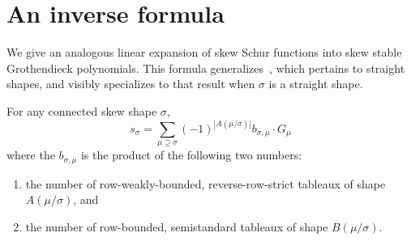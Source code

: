 \documentclass[ALCO,ThmDefs,Unicode,epreuves]{cedram}
\begin{document}
\section{An inverse formula}



We give an analogous linear expansion of skew Schur functions into skew stable Grothendieck polynomials. This formula generalizes~\cite[Theorem~2.7]{lenart-combinatorial}, which pertains to straight shapes, and visibly specializes to that result when $\sigma$ is a straight shape. 

\begin{theorem}\label{t:back}
For any connected skew shape $\sigma$, 
\begin{equation}\label{eq:gsigma-conj}
s_\sigma = \sum_{\mu\supseteq \sigma} (-1)^{|A(\mu/\sigma)|} b_{\sigma,\mu} \cdot G_\mu
\end{equation}
where the $b_{\sigma, \mu}$ is the product of the following two numbers:
\begin{enumerate}
\item the number of row-weakly-bounded, reverse-row-strict tableaux of shape $A( \mu/\sigma)$, and 
\item the number of row-bounded, semistandard tableaux of shape $B(\mu/\sigma)$.
\end{enumerate}
\end{theorem}
\end{document}
